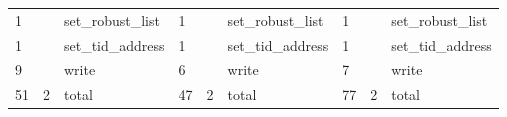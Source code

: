 \documentclass[submit,techreq,noauthor]{eco}	%
\begin{document}
\begin{table}[t]
\begin{tabular}{|lll|lll|lll|}
  \multicolumn{1}{|l|}{1}     & \multicolumn{1}{l|}{}       & set\_robust\_list & \multicolumn{1}{l|}{1}     & \multicolumn{1}{l|}{}       & set\_robust\_list & \multicolumn{1}{l|}{1}     & \multicolumn{1}{l|}{}       & set\_robust\_list \\
  \multicolumn{1}{|l|}{1}     & \multicolumn{1}{l|}{}       & set\_tid\_address & \multicolumn{1}{l|}{1}     & \multicolumn{1}{l|}{}       & set\_tid\_address & \multicolumn{1}{l|}{1}     & \multicolumn{1}{l|}{}       & set\_tid\_address \\
  \multicolumn{1}{|l|}{9}     & \multicolumn{1}{l|}{}       & write             & \multicolumn{1}{l|}{6}     & \multicolumn{1}{l|}{}       & write             & \multicolumn{1}{l|}{7}     & \multicolumn{1}{l|}{}       & write             \\ \hline
  \multicolumn{1}{|l|}{51}    & \multicolumn{1}{l|}{2}      & total             & \multicolumn{1}{l|}{47}    & \multicolumn{1}{l|}{2}      & total             & \multicolumn{1}{l|}{77}    & \multicolumn{1}{l|}{2}      & total             \\ \hline
  \end{tabular}
  \end{table}
\end{document}
